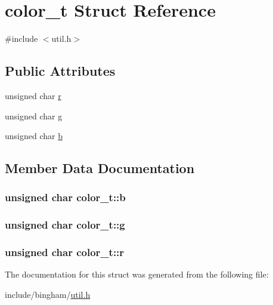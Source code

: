 \hypertarget{structcolor__t}{
\section{color\_\-t Struct Reference}
\label{structcolor__t}
}


{\ttfamily \#include $<$util.h$>$}

\subsection*{Public Attributes}
\begin{DoxyCompactItemize}
\item 
unsigned char \hyperlink{structcolor__t_a99cccc1367c18fa647574c47c05d9c0c}{r}
\item 
unsigned char \hyperlink{structcolor__t_adfd65285ce4faee5230bcc87a6922111}{g}
\item 
unsigned char \hyperlink{structcolor__t_aad840d013c6d88c682485ac754086fd2}{b}
\end{DoxyCompactItemize}


\subsection{Member Data Documentation}
\hypertarget{structcolor__t_aad840d013c6d88c682485ac754086fd2}{
\subsubsection[{b}]{\setlength{\rightskip}{0pt plus 5cm}unsigned char {\bf color\_\-t::b}}}
\label{structcolor__t_aad840d013c6d88c682485ac754086fd2}
\hypertarget{structcolor__t_adfd65285ce4faee5230bcc87a6922111}{
\subsubsection[{g}]{\setlength{\rightskip}{0pt plus 5cm}unsigned char {\bf color\_\-t::g}}}
\label{structcolor__t_adfd65285ce4faee5230bcc87a6922111}
\hypertarget{structcolor__t_a99cccc1367c18fa647574c47c05d9c0c}{
\subsubsection[{r}]{\setlength{\rightskip}{0pt plus 5cm}unsigned char {\bf color\_\-t::r}}}
\label{structcolor__t_a99cccc1367c18fa647574c47c05d9c0c}


The documentation for this struct was generated from the following file:\begin{DoxyCompactItemize}
\item 
include/bingham/\hyperlink{util_8h}{util.h}\end{DoxyCompactItemize}
